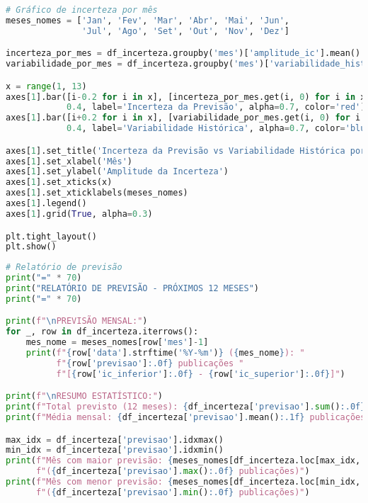 \begin{pythonbox}
\begin{lstlisting}[language=Python]
# Gráfico de incerteza por mês
meses_nomes = ['Jan', 'Fev', 'Mar', 'Abr', 'Mai', 'Jun',
               'Jul', 'Ago', 'Set', 'Out', 'Nov', 'Dez']

incerteza_por_mes = df_incerteza.groupby('mes')['amplitude_ic'].mean()
variabilidade_por_mes = df_incerteza.groupby('mes')['variabilidade_historica'].mean()

x = range(1, 13)
axes[1].bar([i-0.2 for i in x], [incerteza_por_mes.get(i, 0) for i in x], 
            0.4, label='Incerteza da Previsão', alpha=0.7, color='red')
axes[1].bar([i+0.2 for i in x], [variabilidade_por_mes.get(i, 0) for i in x], 
            0.4, label='Variabilidade Histórica', alpha=0.7, color='blue')

axes[1].set_title('Incerteza da Previsão vs Variabilidade Histórica por Mês')
axes[1].set_xlabel('Mês')
axes[1].set_ylabel('Amplitude da Incerteza')
axes[1].set_xticks(x)
axes[1].set_xticklabels(meses_nomes)
axes[1].legend()
axes[1].grid(True, alpha=0.3)

plt.tight_layout()
plt.show()
\end{lstlisting}
\end{pythonbox}

\begin{pythonbox}
\begin{lstlisting}[language=Python]
# Relatório de previsão
print("=" * 70)
print("RELATÓRIO DE PREVISÃO - PRÓXIMOS 12 MESES")
print("=" * 70)

print(f"\nPREVISÃO MENSAL:")
for _, row in df_incerteza.iterrows():
    mes_nome = meses_nomes[row['mes']-1]
    print(f"{row['data'].strftime('%Y-%m')} ({mes_nome}): "
          f"{row['previsao']:.0f} publicações "
          f"[{row['ic_inferior']:.0f} - {row['ic_superior']:.0f}]")

print(f"\nRESUMO ESTATÍSTICO:")
print(f"Total previsto (12 meses): {df_incerteza['previsao'].sum():.0f} publicações")
print(f"Média mensal: {df_incerteza['previsao'].mean():.1f} publicações")

max_idx = df_incerteza['previsao'].idxmax()
min_idx = df_incerteza['previsao'].idxmin()
print(f"Mês com maior previsão: {meses_nomes[df_incerteza.loc[max_idx, 'mes']-1]} "
      f"({df_incerteza['previsao'].max():.0f} publicações)")
print(f"Mês com menor previsão: {meses_nomes[df_incerteza.loc[min_idx, 'mes']-1]} "
      f"({df_incerteza['previsao'].min():.0f} publicações)")
\end{lstlisting}
\end{pythonbox}

